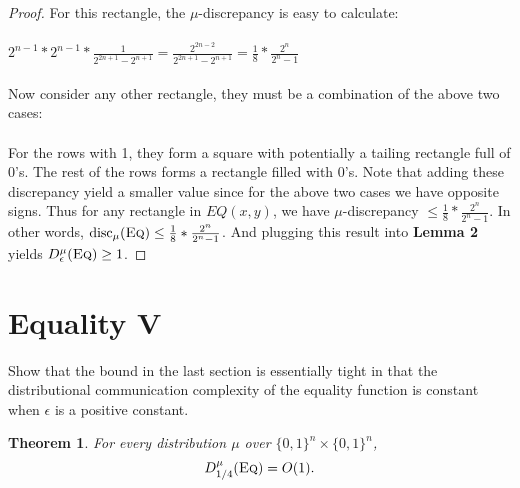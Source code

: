 \documentclass[11pt,oneside]{book}
\theoremstyle{plain}
\newtheorem{theorem}{Theorem}
\theoremstyle{definition}
\theoremstyle{plain}
\newcommand{\disc}{\mathrm{disc}}
\newcommand{\Eq}{\textsc{Eq}}
\begin{document}
\begin{proof}
	For this rectangle, the $\mu$-discrepancy is easy to calculate: \\
	\\
	$2^{n-1}*2^{n-1}*\frac{1}{2^{2n+1}-2^{n+1}} = \frac{2^{2n-2}}{2^{2n+1}-2^{n+1}} = \frac18*\frac{2^n}{2^n-1}$\\
	\\
	Now consider any other rectangle, they must be a combination of the above two cases:\\
	\\
	For the rows with 1, they form a square with potentially a tailing rectangle full of 0's. The rest of the rows forms a rectangle filled with 0's. Note that adding these discrepancy yield a smaller value since for the above two cases we have opposite signs. Thus for any rectangle in $EQ(x,y)$, we have $\mu$-discrepancy $\leq \frac18*\frac{2^n}{2^n-1}$. In other words, $\disc_\mu(\Eq) \leq \frac18*\frac{2^n}{2^n-1}$. And plugging this result into \textbf{Lemma 2} yields $D^\mu_\epsilon(\Eq) \ge 1$.
\end{proof}



 \section{Equality V}

Show that the bound in the last section is essentially tight in that the distributional communication complexity of the equality function is constant when $\epsilon$ is a positive constant.

\begin{theorem}
	For every distribution $\mu$ over $\{0,1\}^n \times \{0,1\}^n$,
	\[
	D^\mu_{1/4}(\Eq) = O(1).
	\]
\end{theorem}
\end{document}
